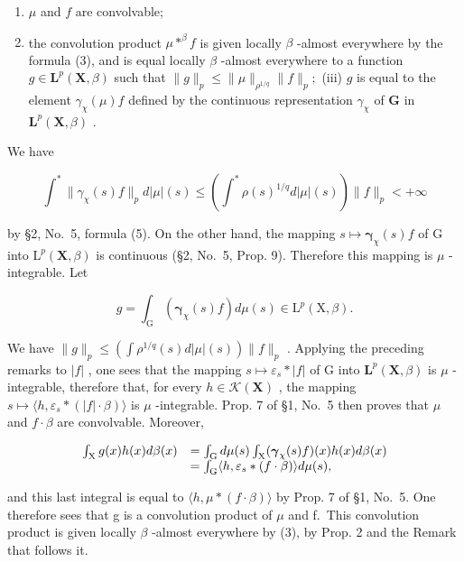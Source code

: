\begin{enumerate}
\def\labelenumi{(\roman{enumi})}
\item
  \(\mu\) and \(f\) are convolvable;
\item
  the convolution product \(\mu * ^ {\beta} f\) is given locally \(\beta\) -almost everywhere by the formula (3), and is equal locally \(\beta\) -almost everywhere to a function \(g\in \mathbf{L}^p (\mathbf{X},\beta)\) such that \(\| g\| _p\leqslant \| \mu \|_{\rho^{1 / q}}\| f\| _p;\) (iii) \(g\) is equal to the element \(\gamma_{\chi}(\mu)f\) defined by the continuous representation \(\gamma_{\chi}\) of \(\mathbf{G}\) in \(\mathbf{L}^p (\mathbf{X},\beta)\) .
\end{enumerate}

We have

\[
\int^ {*} \| \gamma_ {\chi} (s) f \| _ {p} d | \mu | (s) \leqslant \left(\int^ {*} \rho (s) ^ {1 / q} d | \mu | (s)\right) \| f \| _ {p} <   + \infty
\]

by §2, No.~5, formula (5). On the other hand, the mapping \(s \mapsto \pmb{\gamma}_{\chi}(s)f\) of G into \(\mathrm{L}^p (\mathbf{X},\beta)\) is continuous (§2, No.~5, Prop. 9). Therefore this mapping is \(\mu\) -integrable. Let

\[
g = \int_ {\mathrm{G}} \left(\boldsymbol {\gamma} _ {\chi} (s) f\right) d \mu (s) \in \mathrm{L} ^ {p} (\mathrm{X}, \beta).
\]

We have \(\| g\| _p\leqslant \left(\int \rho^{1 / q}(s)d|\mu |(s)\right)\| f\| _p\) . Applying the preceding remarks to \(|f|\) , one sees that the mapping \(s\mapsto \varepsilon_s*\mid f|\) of G into \(\mathbf{L}^p (\mathbf{X},\beta)\) is \(\mu\) -integrable, therefore that, for every \(h\in \mathcal{K}(\mathbf{X})\) , the mapping \(s\mapsto \langle h,\varepsilon_s*(|f|\cdot \beta)\rangle\) is \(\mu\) -integrable. Prop. 7 of §1, No.~5 then proves that \(\mu\) and \(f\cdot \beta\) are convolvable. Moreover,

\[
\begin{array}{r l} \int_ {\mathrm{X}} g (x) h (x) d \beta (x) & = \int_ {\mathrm{G}} d \mu (s) \int_ {\mathrm{X}} (\boldsymbol {\gamma} _ {\chi} (s) f) (x) h (x) d \beta (x) \\ & = \int_ {\mathrm{G}} \langle h, \varepsilon_ {s} * (f \cdot \beta) \rangle d \mu (s), \end{array}
\]

and this last integral is equal to \(\langle h, \mu * (f \cdot \beta) \rangle\) by Prop. 7 of §1, No.~5. One therefore sees that g is a convolution product of \(\mu\) and f.~This convolution product is given locally \(\beta\) -almost everywhere by (3), by Prop. 2 and the Remark that follows it.

